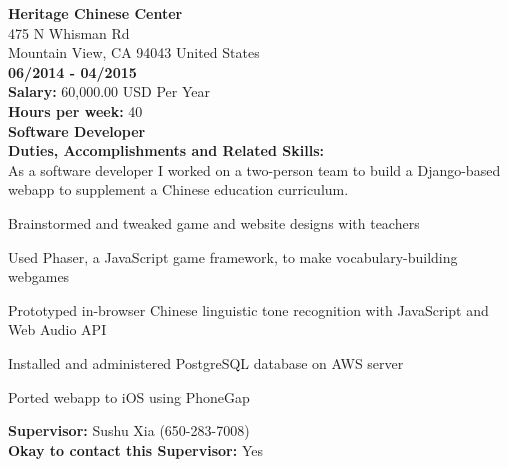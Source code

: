 \noindent\textbf{Heritage Chinese Center}\\
475 N Whisman Rd\\
Mountain View, CA   94043 United States\\
\textbf{06/2014 - 04/2015}\\
\textbf{Salary:} 60,000.00  USD Per Year\\
\textbf{Hours per week:} 40\\
\textbf{Software Developer}\\
\textbf{Duties, Accomplishments and Related Skills:}\\
As a software developer I worked on a two-person team to build a Django-based
webapp to supplement a Chinese education curriculum.
\begin{tightlist}
\item Brainstormed and tweaked game and website designs with teachers

\item Used Phaser, a JavaScript game framework, to make vocabulary-building webgames

\item Prototyped in-browser Chinese linguistic tone recognition with JavaScript and Web Audio API

\item Installed and administered PostgreSQL database on AWS server

\item Ported webapp to iOS using PhoneGap
\end{tightlist}
\textbf{Supervisor:} Sushu Xia (650-283-7008)\\
\textbf{Okay to contact this Supervisor:} Yes\\

